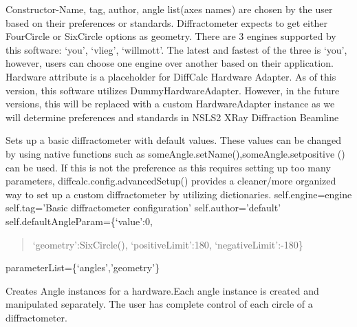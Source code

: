 \documentclass[letterpaper,10pt,english]{sphinxmanual}
\begin{document}
\begin{fulllineitems}
\label{Manual:Diffractometer.Diffractometer}
Constructor-Name, tag, author, angle list(axes names) are chosen by the user based on their preferences or standards. Diffractometer expects to get either FourCircle or SixCircle options as geometry. There are 3 engines supported by this software: `you', `vlieg', `willmott'. The latest and fastest of the three is `you', however, users can choose one engine over another based on their application. Hardware attribute is a placeholder for DiffCalc Hardware Adapter. As of this version, this software utilizes DummyHardwareAdapter. However, in the future versions, this will be replaced with a custom HardwareAdapter instance as we will determine preferences and standards in NSLS2 XRay Diffraction Beamline

\begin{fulllineitems}
\label{Manual:Diffractometer.Diffractometer.basicSetup}
Sets up a basic diffractometer with default values. These values can be changed by using native functions such as
someAngle.setName(),someAngle.setpositive () can be used. If this is not the preference as this requires setting up too many parameters,
diffcalc.config.advancedSetup() provides a cleaner/more organized way to set up a custom diffractometer by utilizing dictionaries.
self.engine=engine   
self.tag='Basic diffractometer configuration'
self.author='default'
self.defaultAngleParam=\{`value':0,
\begin{quote}

`geometry':SixCircle(),
`positiveLimit':180,
`negativeLimit':-180\}
\end{quote}

parameterList=\{`angles','geometry'\}

\end{fulllineitems}


\begin{fulllineitems}
\label{Manual:Diffractometer.Diffractometer.createAngles}
Creates Angle instances for a hardware.Each angle instance is created and manipulated
separately. The user has complete control of each circle of a diffractometer.


\end{fulllineitems}
\end{fulllineitems}
\end{document}

